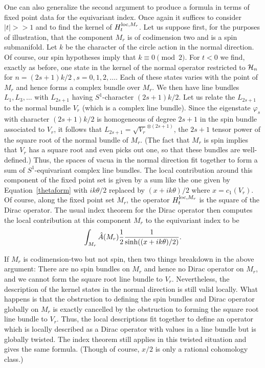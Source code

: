 One can also generalize the second argument to produce a formula in
terms of fixed point data for the equivariant index.
Once again it suffices to consider $|t|>>1$ and to find the kernel of
$H^{{\rm loc},M_r}_t$.
Let us suppose first, for the purposes of illustration, that the component
$M_r$ is of codimension two and is a spin submanifold.
Let $k$ be the character of the circle action in the normal direction.
Of course, our spin hypotheses imply that $k\equiv 0\pmod 2$.
For $t<0$ we find, exactly as before,  one state in the kernel of the
normal operator restricted to ${\cal H}_n$ for $n=(2s+1)k/2\
,s=0,1,2,\ldots$. 
Each of these states varies with the point of $M_r$
and hence forms a complex  bundle over $M_r$.
We then have  line bundles $L_1,L_3,\ldots$ with
$L_{2s+1}$ having $S^1$-character $(2s+1)k/2$.
 Let us relate the $L_{2s+1}$ to the normal bundle $V_r$ (which is a
complex line bundle).
Since the eigenstate $\varphi_s$ with character $(2s+1)k/2$ is
homogeneous of degree $2s+1$ in the spin bundle associated to $V_r$,
it follows that $L_{2s+1}=
\sqrt{V_r}^{\otimes (2s+1)}$, the $2s+1$
tensor power of the square root of the normal bundle of $M_r$. 
(The fact that $M_r$ is spin implies that $V_r$ has a square root and
even picks out one, so that these bundles are
well-defined.) 
Thus,  the spaces of vacua in the normal direction fit together to
form  a sum of 
$S^1$-equivariant complex line bundles.
The local contribution around this component of the fixed point set is
given by a sum like the one given by Equation~\ref{thetaform} with
$ik\theta/2$ replaced by $(x+ik\theta)/2$ where $x=c_1(V_r)$.
Of course, along the fixed point set $M_r$, the operator $H_t^{{\rm
loc},M_r}$ is the square of the Dirac operator.
The usual index theorem for the Dirac operator then computes the local
contribution at this component $M_r$ to the equivariant index to be
$$\int_{M_r}\hat A(M_r)\frac{1}{2}\frac{1}{{\rm
sinh}((x+ik\theta)/2)}.$$ 


If $M_r$ is codimension-two but not spin, then two things breakdown in
the above argument:  There are no spin bundles on $M_r$ and hence  no
Dirac operator on $M_r$,  and  we cannot form the square root line
bundle to $V_r$.  Nevertheless, the description of the kernel states
in the normal direction is still valid locally.  What happens is that
the obstruction to defining the spin bundles and Dirac operator
globally on $M_r$ is exactly cancelled by the obstruction to forming
the square root line bundle to $V_r$.  Thus, the local descriptions
fit together to define an operator which is locally described as a
Dirac operator with values in a line bundle but is globally twisted.
The index theorem still 
applies in this twisted situation and gives the same formula.
(Though of course, $x/2$ is only a rational cohomology class.)

